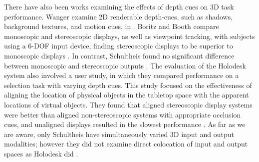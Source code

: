 There have also been works examining the effects of depth cues on 3D task
performance. Wanger \etal examine 2D renderable depth-cues, such as shadows,
background textures, and motion cues, in \cite{wanger1992perceiving}. Boritz and
Booth compare monoscopic and stereoscopic displays, as well as viewpoint
tracking, with subjects using a 6-DOF input device, finding stereoscopic
displays to be superior to monoscopic displays \cite{boritz1997study}. In
contrast, Schultheis \etal found no significant
difference between monoscopic and stereoscopic outputs
\cite{schultheis2012comparison}. The evaluation of the Holodesk
system also involved
a user study, in which they compared performance on a selection task with varying
depth cues. This study
focused on the effectiveness of aligning the location of physical objects in the tabletop
space with the apparent locations of virtual objects. They found that aligned
stereoscopic display systems were better than aligned non-stereoscopic systems
with appropriate occlusion cues, and unaligned displays resulted in the slowest
performance \cite{holodesk}. As far as we are aware, only Schultheis \etal have
simultaneously varied 3D input and output modalities; however they did not
examine direct colocation of input and output spaces as Holodesk did
\cite{holodesk,schultheis2012comparison}.

